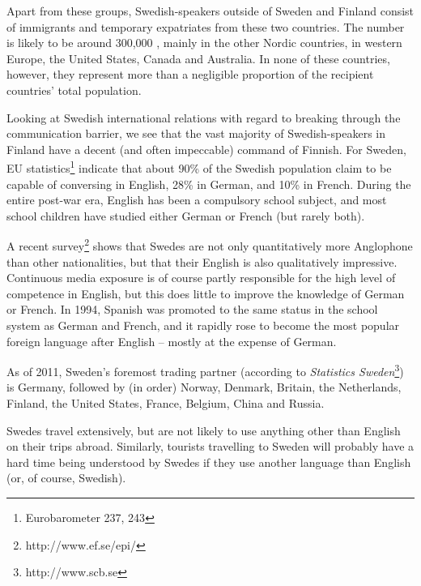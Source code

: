 \begin{multicols}{2}
Apart from these groups, Swedish-speakers outside of Sweden and
Finland consist of immigrants and temporary expatriates from these two
countries. The number is likely to be around 300,000
\cite{parkvall2010}, mainly in the other Nordic countries, in western
Europe, the United States, Canada and Australia. In none of these
countries, however, they represent more than a negligible
proportion of the recipient countries' total population.

Looking at Swedish international relations with regard to breaking through the
communication barrier, we see that the vast majority of
Swedish-speakers in Finland have a decent (and often impeccable)
command of Finnish. For Sweden, EU statistics\footnote{Eurobarometer
  237, 243} indicate that about 90\% of the Swedish population claim
to be capable of conversing in English, 28\% in German, and 10\% in
French. During the entire post-war era, English has been a compulsory
school subject, and most school children have studied either German or
French (but rarely both). 


A recent survey\footnote{http://www.ef.se/epi/} shows that Swedes are not only
quantitatively more Anglophone than other nationalities, but that
their English is also qualitatively impressive. Continuous media
exposure is of course partly responsible for the high level of
competence in English, but this does little to improve the knowledge
of German or French. In 1994, Spanish was promoted to the same status
in the school system as German and French, and it rapidly rose to
become the most popular foreign language after English -- mostly at the
expense of German.

As of 2011, Sweden's foremost trading partner (according to
\textit{Statistics Sweden}\footnote{http://www.scb.se}) is Germany,
followed by (in order) Norway, Denmark, Britain, the Netherlands,
Finland, the United States, France, Belgium, China and Russia.

Swedes travel extensively, but are not likely to use anything other
than English on their trips abroad.  Similarly, tourists travelling to
Sweden will probably have a hard time being understood by Swedes if
they use another language than English (or, of course, Swedish).


\end{multicols}
